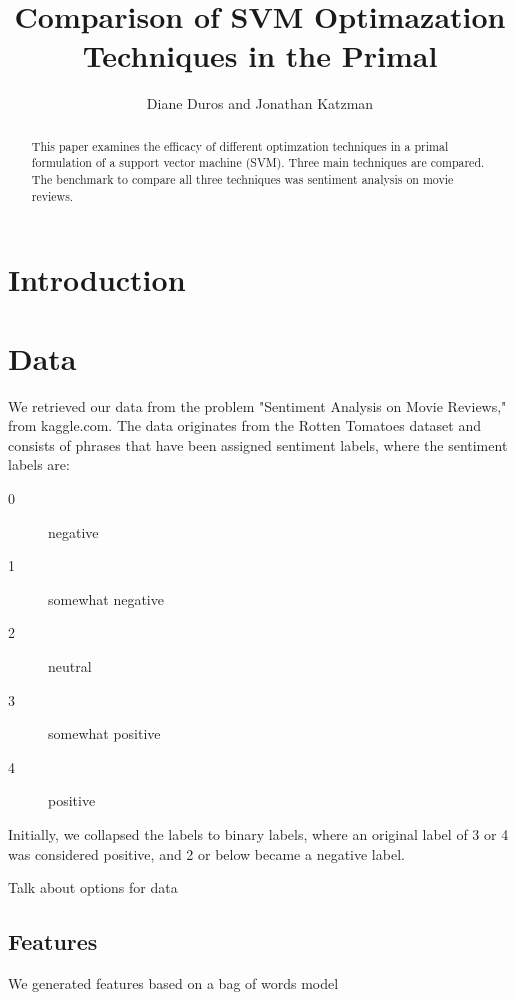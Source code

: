 \documentclass[letterpaper, 11pt]{article}
\begin{document}
\title{Comparison of SVM Optimazation Techniques in the Primal}
\author{Diane Duros and Jonathan Katzman}
\maketitle
\begin{abstract}This paper examines the efficacy of different optimzation techniques in a primal formulation of a support vector machine (SVM).  Three main techniques are compared.  The benchmark to compare all three techniques was sentiment analysis on movie reviews.
\end{abstract}
                                                                                                                                                                                                                                                                           
\section{Introduction}


\section{Data}
We retrieved our data from the problem "Sentiment Analysis on Movie Reviews," from kaggle.com.  The data originates from the Rotten Tomatoes dataset and consists of phrases that have been assigned sentiment labels, where the sentiment labels are:
\begin{description}
	\item[0] negative
	\item[1] somewhat negative
	\item[2] neutral
	\item[3] somewhat positive
	\item[4] positive
\end{description}

Initially, we collapsed the labels to binary labels, where an original label of 3 or 4 was considered positive, and 2 or below became a negative label.  

Talk about options for data

\subsection{Features}
We generated features based on a bag of words model
\end{document}
